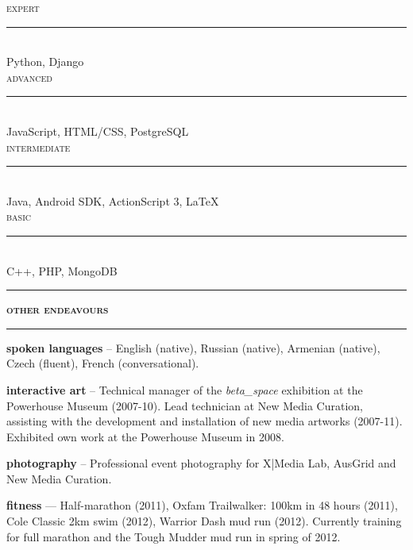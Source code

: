 \documentclass[a4paper,12pt]{article}
\begin{document}
\begin{spacing}{0.95}
\begin{minipage}[t]{95.5mm}
	{\large\textsc{expert}}\\
	\vspace{-2mm}%
	\rule[3mm]{\linewidth}{0.25mm}\\
	{\LARGE Python, Django}
	\\
	
	{\large\textsc{advanced}}\\
	\vspace{-2.1mm}%
	\rule[3mm]{\linewidth}{0.25mm}\\
	{\Large JavaScript, HTML/CSS, PostgreSQL}
	\\
	
	{\large\textsc{intermediate}}\\
	\vspace{-2.7mm}%
	\rule[3mm]{\linewidth}{0.25mm}\\	
	{\large Java, Android SDK, ActionScript 3, \LaTeX{}}
	\\
	
	{\large\textsc{basic}}\\
	\vspace{-3.2mm}%
	\rule[3mm]{\linewidth}{0.25mm}\\
	{\normalsize C++, PHP, MongoDB}
	
	\vspace{2.5mm}
	\rule[1mm]{\linewidth}{1mm}
	{\Large\textsc{\textbf{other endeavours}}}\\
	\vspace{2.5mm}%
	\rule[1mm]{\linewidth}{1mm}
	
	{\small
	\textbf{\textsf{spoken languages}} -- English (native), Russian (native), Armenian (native), Czech (fluent), French (conversational).
	
	\vspace{3mm}
	\textbf{\textsf{interactive art}} -- Technical manager of the \emph{beta\_space} exhibition at the Powerhouse Museum (2007-10). Lead technician at New Media Curation, assisting with the development and installation of  new media artworks (2007-11). Exhibited own work at the Powerhouse Museum in 2008.
	
	\vspace{3mm}
	\textbf{\textsf{photography}} -- Professional event photography for X|Media Lab, AusGrid and New Media Curation.
	
	\vspace{3mm}
	\textbf{\textsf{fitness}} --- Half-marathon (2011), Oxfam Trailwalker: 100km in 48 hours (2011), Cole Classic 2km swim (2012), Warrior Dash mud run (2012). Currently training for full marathon and the Tough Mudder mud run in spring of 2012.%
	}%
	

\end{minipage}
\end{spacing}
\end{document}

